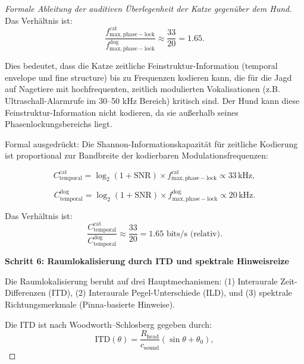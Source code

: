﻿\documentclass[12pt, a4paper]{article}
\theoremstyle{definition}
\theoremstyle{remark}
\begin{document}
\begin{proof}[Formale Ableitung der auditiven Überlegenheit der Katze gegenüber dem Hund]
Das Verhältnis ist:
\begin{equation}
\frac{f_{\mathrm{max, phase-lock}}^{\mathrm{cat}}}{f_{\mathrm{max, phase-lock}}^{\mathrm{dog}}} \approx \frac{33}{20} = 1.65.
\label{eq:phase_lock_ratio_derived}
\end{equation}

Dies bedeutet, dass die Katze zeitliche Feinstruktur-Information (temporal envelope und fine structure) bis zu Frequenzen kodieren kann, die für die Jagd auf Nagetiere mit hochfrequenten, zeitlich modulierten Vokalisationen (z.B. Ultraschall-Alarmrufe im 30--50 kHz Bereich) kritisch sind. Der Hund kann diese Feinstruktur-Information nicht kodieren, da sie außerhalb seines Phasenlockungsbereichs liegt.

Formal ausgedrückt: Die Shannon-Informationskapazität für zeitliche Kodierung ist proportional zur Bandbreite der kodierbaren Modulationsfrequenzen:

\begin{equation}
C_{\text{temporal}}^{\mathrm{cat}} = \log_2(1 + \text{SNR}) \times f_{\mathrm{max, phase-lock}}^{\mathrm{cat}} \propto 33\,\mathrm{kHz},
\label{eq:shannon_capacity_cat_temporal}
\end{equation}

\begin{equation}
C_{\text{temporal}}^{\mathrm{dog}} = \log_2(1 + \text{SNR}) \times f_{\mathrm{max, phase-lock}}^{\mathrm{dog}} \propto 20\,\mathrm{kHz}.
\label{eq:shannon_capacity_dog_temporal}
\end{equation}

Das Verhältnis ist:
\begin{equation}
\frac{C_{\text{temporal}}^{\mathrm{cat}}}{C_{\text{temporal}}^{\mathrm{dog}}} \approx \frac{33}{20} = 1.65 \text{ bits/s (relativ)}.
\label{eq:shannon_temporal_ratio}
\end{equation}

\textbf{Schritt 6: Raumlokalisierung durch ITD und spektrale Hinweisreize}

Die Raumlokalisierung beruht auf drei Hauptmechanismen: (1) Interaurale Zeit-Differenzen (ITD), (2) Interaurale Pegel-Unterschiede (ILD), und (3) spektrale Richtungsmerkmale (Pinna-basierte Hinweise).

Die ITD ist nach Woodworth--Schlosberg gegeben durch:
\begin{equation}
\text{ITD}(\theta) = \frac{R_{\mathrm{head}}}{c_{\text{sound}}} (\sin\theta + \theta_0),
\label{eq:itd_formula}
\end{equation}


\end{proof}
\end{document}
